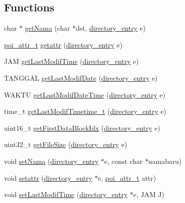 \subsection*{Functions}
\begin{DoxyCompactItemize}
\item 
char $\ast$ \hyperlink{directory-entry_8h_a0a7b4158bec0f7e95ad6df41314397cd}{get\-Nama} (char $\ast$dst, \hyperlink{structdirectory__entry}{directory\-\_\-entry} e)
\item 
\hyperlink{structpoi__attr__t}{poi\-\_\-attr\-\_\-t} \hyperlink{directory-entry_8h_a227f567ee0e8d9841e899f0dec64d678}{getattr} (\hyperlink{structdirectory__entry}{directory\-\_\-entry} e)
\item 
J\-A\-M \hyperlink{directory-entry_8h_aefc5e5fefc3001fa03539165440f4720}{get\-Last\-Modif\-Time} (\hyperlink{structdirectory__entry}{directory\-\_\-entry} e)
\item 
T\-A\-N\-G\-G\-A\-L \hyperlink{directory-entry_8h_a40cef09c0fc8f91e59441578582e0b8e}{get\-Last\-Modif\-Date} (\hyperlink{structdirectory__entry}{directory\-\_\-entry} e)
\item 
W\-A\-K\-T\-U \hyperlink{directory-entry_8h_a470a6bf272a569acfa071474105e2317}{get\-Last\-Modif\-Date\-Time} (\hyperlink{structdirectory__entry}{directory\-\_\-entry} e)
\item 
time\-\_\-t \hyperlink{directory-entry_8h_ac5adead83b794823faf9472d68a6ce23}{get\-Last\-Modif\-Timetime\-\_\-t} (\hyperlink{structdirectory__entry}{directory\-\_\-entry} e)
\item 
uint16\-\_\-t \hyperlink{directory-entry_8h_ae2d5c0b699d98670b2d768bc747ee9c3}{get\-First\-Data\-Block\-Idx} (\hyperlink{structdirectory__entry}{directory\-\_\-entry} e)
\item 
uint32\-\_\-t \hyperlink{directory-entry_8h_a21ccf64e7638d962dba75f7c4b62ab69}{get\-File\-Size} (\hyperlink{structdirectory__entry}{directory\-\_\-entry} e)
\item 
void \hyperlink{directory-entry_8h_addf18916a7811fb36426ee54da8ae725}{set\-Nama} (\hyperlink{structdirectory__entry}{directory\-\_\-entry} $\ast$e, const char $\ast$namabaru)
\item 
void \hyperlink{directory-entry_8h_ab707665b70d7b489fea00097a365302b}{setattr} (\hyperlink{structdirectory__entry}{directory\-\_\-entry} $\ast$e, \hyperlink{structpoi__attr__t}{poi\-\_\-attr\-\_\-t} attr)
\item 
void \hyperlink{directory-entry_8h_a0dbc96b3055551072fccce217082e16a}{set\-Last\-Modif\-Time} (\hyperlink{structdirectory__entry}{directory\-\_\-entry} $\ast$e, J\-A\-M J)

\end{DoxyCompactItemize}
